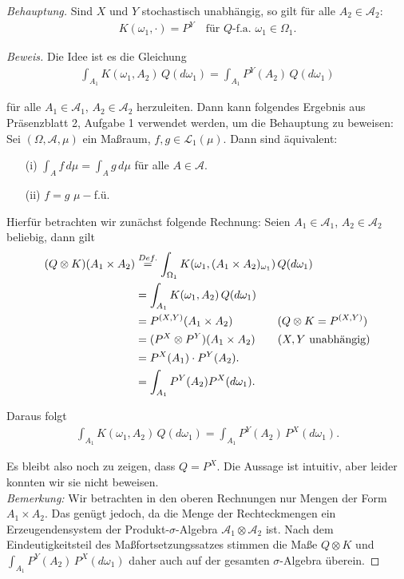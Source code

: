 \documentclass[10pt]{article}
\newcommand{\A}{\mathcal{A}}
\newcommand{\beh}{\textit{Behauptung. }}
\begin{document}
\beh Sind $X$ und $Y$ stochastisch unabhängig, so gilt für alle $A_2\in \A_2$:
	\begin{align*}
		K(\omega_1, \cdot) = P^Y \quad\text{für $Q$-f.a. $\omega_1\in\Omega_1$}.
	\end{align*}

\begin{proof}[Beweis]
	Die Idee ist es die Gleichung
	\begin{align*}
		\int_{A_1} K(\omega_1, A_2) \, Q(d\omega_1) = \int_{A_1} P^{Y}(A_2) \, Q(d\omega_1)
	\end{align*}

	für alle $A_1\in\A_1$, $A_2\in\A_2$ herzuleiten. Dann kann folgendes Ergebnis aus Präsenzblatt 2, Aufgabe 1 verwendet werden,
	um die Behauptung zu beweisen: \\
	Sei $(\Omega,\A,\mu)$ ein Maßraum, $f,g\in\mathcal{L}_1(\mu)$. Dann sind äquivalent: 
	\begin{itemize}
		\item[(i)] $\int_{A} f \, d\mu = \int_{A} g \, d\mu$  für alle $A\in\A$.
		\item[(ii)] $f = g$ $\mu-$f.ü.
	\end{itemize}

	Hierfür betrachten wir zunächst folgende Rechnung: Seien $A_1\in\A_1$, $A_2\in\A_2$ beliebig, dann gilt
	\begin{align*}
		(Q\otimes K)(A_1 \times A_2) &\stackrel{Def.}{=} \int_{\Omega_1} K(\omega_1, (A_1\times A_2)_{\omega_1}) \, Q(d\omega_1) \\
									 &= \int_{A_1} K(\omega_1, A_2) \, Q(d\omega_1)						    \\
									 &= P^{(X,Y)}(A_1\times A_2) \hspace{0.7cm}\qquad (Q\otimes K = P^{(X,Y)})   \\
									 &= (P^X \otimes P^Y)(A_1 \times A_2)  \qquad (X,Y \text{ unabhängig})  \\
									 &= P^X(A_1) \cdot P^Y(A_2).											\\
									 &= \int_{A_1} P^Y(A_2) P^X(d\omega_1).
	\end{align*}

	Daraus folgt 
	\begin{align*}
		\int_{A_1} K(\omega_1, A_2) \, Q(d\omega_1) = \int_{A_1} P^Y(A_2) \, P^X(d\omega_1).
	\end{align*}

	Es bleibt also noch zu zeigen, dass $Q = P^X$. Die Aussage ist intuitiv, aber leider konnten wir sie nicht beweisen.  \\
	\textit{Bemerkung:} Wir betrachten in den oberen Rechnungen nur Mengen der Form $A_1 \times A_2$. Das genügt jedoch, da die 
	Menge der Rechteckmengen ein Erzeugendensystem der Produkt-$\sigma$-Algebra $\A_1 \otimes \A_2$ ist. Nach dem Eindeutigkeitsteil
	des Maßfortsetzungssatzes stimmen die Maße $Q\otimes K$ und $\int_{A_1} P^Y(A_2) \, P^X(d\omega_1)$ daher auch auf der gesamten 
	$\sigma$-Algebra überein.
\end{proof}
\end{document}

